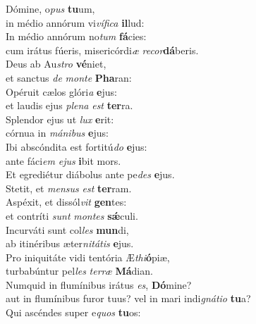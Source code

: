 \evenverse Dómine, o\textit{pus} \textbf{tu}um,~\*\\
\evenverse in médio annórum vi\textit{ví}\textit{fi}\textit{ca} \textbf{il}lud:\\
\oddverse In médio annórum no\textit{tum} \textbf{fá}cies:~\*\\
\oddverse cum irátus fúeris, misericórdi\textit{æ} \textit{re}\textit{cor}\textbf{dá}beris.\\
\evenverse Deus ab Au\textit{stro} \textbf{vé}niet,~\*\\
\evenverse et sanctus \textit{de} \textit{mon}\textit{te} \textbf{Pha}ran:\\
\oddverse Opéruit cælos glóri\textit{a} \textbf{e}jus:~\*\\
\oddverse et laudis ejus \textit{ple}\textit{na} \textit{est} \textbf{ter}ra.\\
\evenverse Splendor ejus ut \textit{lux} \textbf{e}rit:~\*\\
\evenverse córnua in \textit{má}\textit{ni}\textit{bus} \textbf{e}jus:\\
\oddverse Ibi abscóndita est fortitú\textit{do} \textbf{e}jus:~\*\\
\oddverse ante fáci\textit{em} \textit{e}\textit{jus} \textbf{i}bit mors.\\
\evenverse Et egrediétur diábolus ante pe\textit{des} \textbf{e}jus.~\*\\
\evenverse Stetit, et \textit{men}\textit{sus} \textit{est} \textbf{ter}ram.\\
\oddverse Aspéxit, et dissól\textit{vit} \textbf{gen}tes:~\*\\
\oddverse et contríti \textit{sunt} \textit{mon}\textit{tes} \textbf{sǽ}culi.\\
\evenverse Incurváti sunt col\textit{les} \textbf{mun}di,~\*\\
\evenverse ab itinéribus æter\textit{ni}\textit{tá}\textit{tis} \textbf{e}jus.\\
\oddverse Pro iniquitáte vidi tentória Æ\textit{thi}\textbf{ó}piæ,~\*\\
\oddverse turbabúntur pel\textit{les} \textit{ter}\textit{ræ} \textbf{Má}dian.\\
\evenverse Numquid in flumínibus irátus \textit{es}, \textbf{Dó}mine?~\*\\
\evenverse aut in flumínibus furor tuus? vel in mari indi\textit{gná}\textit{ti}\textit{o} \textbf{tu}a?\\
\oddverse Qui ascéndes super e\textit{quos} \textbf{tu}os:~\*\\
